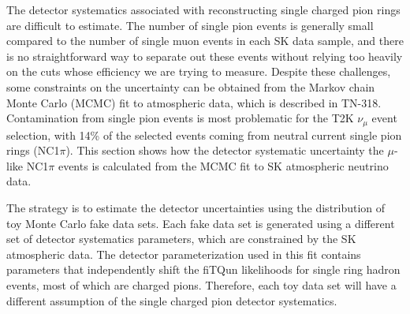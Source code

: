 \documentclass[12pt]{article}
\def\numu{$\nu_{\mu}$\xspace}
\begin{document}
The detector systematics associated with reconstructing single charged pion rings are difficult 
to estimate.  The number of single pion events is generally small compared to the number of single muon events 
in each SK data sample, and there is no straightforward way to separate out these events without relying too 
heavily on the cuts whose efficiency we are trying to measure.  Despite these challenges, some constraints on
the uncertainty can be obtained from the Markov chain Monte Carlo (MCMC) fit to atmospheric data, which is described in 
TN-318.  Contamination from single pion events is most problematic for the T2K \numu event selection, with
14\% of the selected events coming from neutral current single pion rings (NC1$\pi$).  This section shows 
how the detector systematic uncertainty the $\mu$-like NC1$\pi$ events is calculated from the MCMC fit
to SK atmospheric neutrino data.

The strategy is to estimate the detector uncertainties using the distribution of toy Monte Carlo fake data sets.
Each fake data set is generated using a different set of detector systematics parameters, which are constrained
by the SK atmospheric data.  The detector parameterization used in this fit contains parameters that
independently shift the fiTQun likelihoods for single ring hadron events, most of which are charged pions. 
Therefore, each toy data set will have a different assumption of the single charged pion detector systematics.
\end{document}
